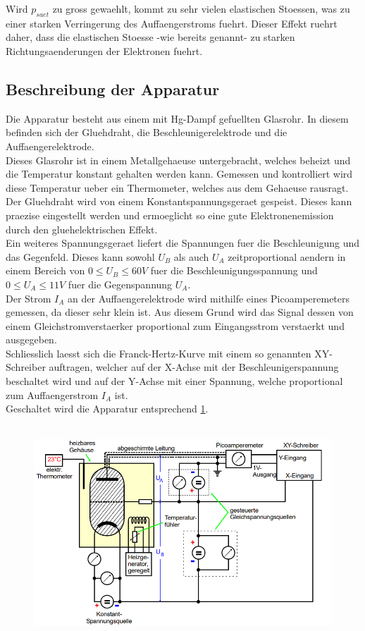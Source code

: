 Wird $p_{saet}$ zu gross gewaehlt, kommt zu sehr vielen elastischen Stoessen, was zu einer starken Verringerung des Auffaengerstroms fuehrt. Dieser Effekt ruehrt daher, dass die elastischen Stoesse -wie bereits genannt- zu starken Richtungsaenderungen der Elektronen fuehrt.
\subsection{Beschreibung der Apparatur}
Die Apparatur besteht aus einem mit Hg-Dampf gefuellten Glasrohr. In diesem befinden sich der Gluehdraht, die Beschleunigerelektrode und die Auffaengerelektrode.\\
Dieses Glasrohr ist in einem Metallgehaeuse untergebracht, welches beheizt und die Temperatur konstant gehalten werden kann. Gemessen und kontrolliert wird diese Temperatur ueber ein Thermometer, welches aus dem Gehaeuse rausragt.\\
Der Gluehdraht wird von einem Konstantspannungsgeraet gespeist. Dieses kann praezise eingestellt werden und ermoeglicht so eine gute Elektronenemission durch den gluehelektrischen Effekt.\\
Ein weiteres Spannungsgeraet liefert die Spannungen fuer die Beschleunigung und das Gegenfeld. Dieses kann sowohl $U_B$ als auch $U_A$ zeitproportional aendern in einem Bereich von $0\leq U_B\leq 60V$ fuer die Beschleunigungsspannung und $0\leq U_A\leq 11V$ fuer die Gegenspannung $U_A$.\\
Der Strom $I_A$ an der Auffaengerelektrode wird mithilfe eines Picoamperemeters gemessen, da dieser sehr klein ist. Aus diesem Grund wird das Signal dessen von einem Gleichstromverstaerker proportional zum Eingangsstrom verstaerkt und ausgegeben.\\
Schliesslich laesst sich die Franck-Hertz-Kurve mit einem so genannten XY-Schreiber auftragen, welcher auf der X-Achse mit der Beschleunigerspannung beschaltet wird und auf der Y-Achse mit einer Spannung, welche proportional zum Auffaengerstrom $I_A$ ist.\\
Geschaltet wird die Apparatur entsprechend \ref{Fig:Schaltung}.
\begin{figure}[H]
    \centering
    \captionsetup{justification=centering}
    \includegraphics[height=8cm]{"Schaltung_FranckHertz.png"}
    \label{Fig:Schaltung}
\end{figure}
